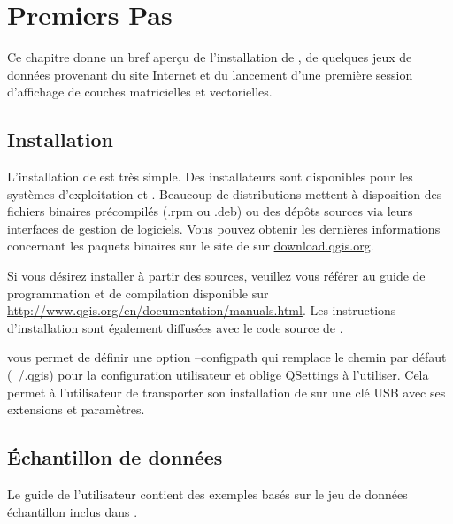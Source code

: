 
\chapter{Premiers Pas}\label{label_getstarted}


Ce chapitre donne un bref aperçu de l'installation de \qg, de quelques jeux de données provenant du site Internet et du lancement d'une première session d'affichage de couches matricielles et vectorielles.

\section{Installation}\label{label_installation}

L'installation de \qg est très simple. Des installateurs sont disponibles pour les systèmes d'exploitation \mswin et \mac. Beaucoup de distributions \tux mettent à disposition des fichiers binaires précompilés (.rpm ou .deb) ou des dépôts sources via leurs interfaces de gestion de logiciels. Vous pouvez obtenir les dernières informations concernant les paquets binaires sur le site de \qg sur \url{download.qgis.org}.


Si vous désirez installer \qg à  partir des sources, veuillez vous référer au guide de programmation et de compilation disponible sur \url{http://www.qgis.org/en/documentation/manuals.html}.
Les instructions d'installation sont également diffusées avec le code source de \qg.


\qg vous permet de définir une option --configpath qui remplace le chemin par défaut (~/.qgis) pour la configuration utilisateur et oblige QSettings à l'utiliser. Cela permet à l'utilisateur de transporter son installation de \qg sur une clé USB avec ses extensions et paramètres.

\section{Échantillon de données}\label{label_sampledata}

Le guide de l'utilisateur contient des exemples basés sur le jeu de données échantillon inclus dans \qg.

